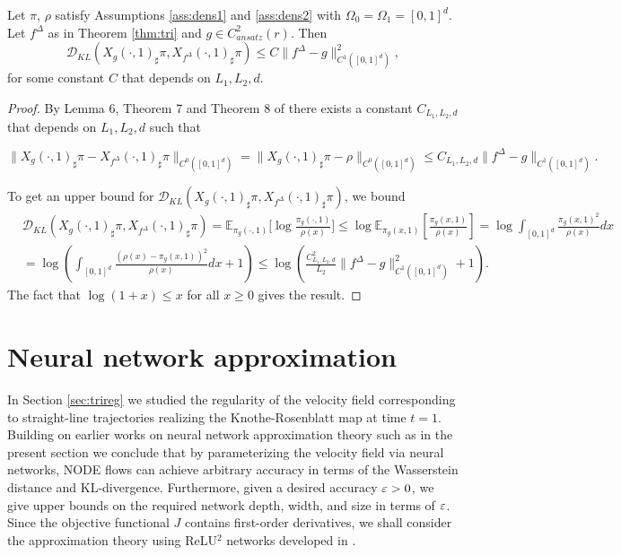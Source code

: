 \begin{theorem}\label{Thm:KLstatbility}
Let $\pi$, $\rho$ %
satisfy Assumptions \ref{ass:dens1} and \ref{ass:dens2} with $\Omega_0 = \Omega_1 = [0,1]^d$. Let $f^\Delta$ as in Theorem \ref{thm:tri} and  $g\in C^2_{ansatz}(r)$. %
Then
\[\mathcal{D}_{KL}(X_g(\cdot, 1)_\sharp\pi, X_{f^\Delta}(\cdot, 1)_\sharp\pi) \leq C \|f^\Delta - g\|^2_{C^1([0,1]^d)},\]
for some constant $C$ that depends on $L_1, L_2, d$. 
\end{theorem}
\begin{proof}
By Lemma 6, Theorem 7 and Theorem 8 of \cite{StatisticalNODE} there exists a constant $C_{L_1,L_2, d}$ that depends on $L_1, L_2, d$ such that 

\[\|X_g(\cdot, 1)_\sharp\pi - X_{f^\Delta}(\cdot, 1)_\sharp\pi\|_{C^0([0,1]^d)}  = \|X_g(\cdot, 1)_\sharp\pi - \rho\|_{C^0([0,1]^d)}\leq C_{L_1,L_2, d}\|f^\Delta - g\|_{C^1([0,1]^d)}.\] 

To get an upper bound for $\mathcal{D}_{KL}(X_g(\cdot,1)_\sharp\pi, X_{f^\Delta}(\cdot,1)_\sharp\pi)$, we bound
\begin{align*}
&\mathcal{D}_{KL}(X_g(\cdot,1)_\sharp\pi, X_{f^\Delta}(\cdot,1)_\sharp\pi) = \mathbb{E}_{\pi_g(\cdot,1)}\Big[\log \frac{\pi_g(\cdot,1)}{\rho(x)}\Big] \leq \log \mathbb{E}_{\pi_g(x,1)}[\frac{\pi_g(x,1)}{\rho(x)}] = \log\int_{[0,1]^d} \frac{\pi_g(x,1)^2}{\rho(x)}dx \\
&= \log\left(\int_{[0,1]^d} \frac{(\rho(x)-\pi_g(x,1))^2}{\rho(x)}dx + 1\right)  \leq \log\left(\frac{C_{L_1,L_2, d}^2}{L_2} \|f^\Delta - g\|^2_{C^1([0,1]^d)}+1\right).     
\end{align*}
The fact that $\log(1+x)\le x$ for all $x\ge 0$ gives the result.
\end{proof}












\section{Neural network approximation}\label{sec:NN}
In Section \ref{sec:trireg} we studied the regularity of the velocity
field corresponding to straight-line trajectories realizing the
Knothe-Rosenblatt map at time $t=1$. Building on earlier works on
neural network approximation theory such as
\cite{NNApproximation1,NNApproximation4, StatisticalNODE}
in the present section we conclude that by parameterizing the velocity
field via neural networks, NODE flows can achieve arbitrary accuracy
in terms of the Wasserstein distance and KL-divergence. Furthermore,
given a desired accuracy $\varepsilon>0$, we give upper bounds on the
required network depth, width, and size in terms of $\varepsilon$. Since the objective functional $J$ contains first-order derivatives, we shall consider the approximation theory using ReLU$^2$ networks developed in \cite{StatisticalNODE}. 

